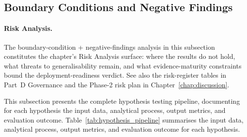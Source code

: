 
\subsection{Boundary Conditions and Negative Findings}
\label{sec:ch4_boundary_conditions}

\paragraph{Risk Analysis.}
The boundary-condition + negative-findings analysis in this subsection constitutes the chapter's Risk Analysis surface: where the results do not hold, what threats to generalisability remain, and what evidence-maturity constraints bound the deployment-readiness verdict. See also the risk-register tables in Part~D Governance and the Phase-2 risk plan in Chapter~\ref{chap:discussion}.

\iffalse
This subsection presents the complete hypothesis testing pipeline, documenting for each hypothesis the input data, analytical process, output metrics, and evaluation outcome. Table~\ref{tab:hypothesis_pipeline} summarises the input data, analytical process, output metrics, and evaluation outcome for each hypothesis.

